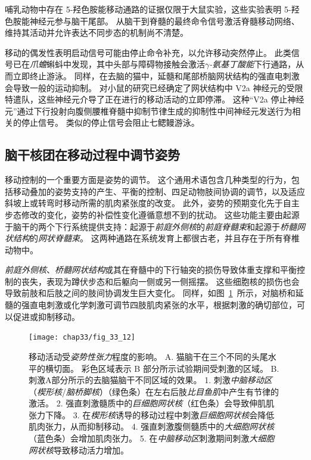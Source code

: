 哺乳动物中存在 5-羟色胺能移动通路的证据仅限于大鼠实验，这些实验表明 5-羟色胺能神经元参与脑干尾部。
从脑干到脊髓的最终命令信号激活脊髓移动网络、维持其活动并允许表达不同步态的机制尚不清楚。


移动的偶发性表明启动信号可能由停止命令补充，以允许移动突然停止。
此类信号已在\textit{爪蟾}蝌蚪中发现，其中头部与障碍物接触会激活\textit{$\gamma$-氨基丁酸能}下行通路，从而立即终止游泳。
同样，在去脑的猫中，延髓和尾部桥脑网状结构的强直电刺激会导致一般的运动抑制。
对小鼠的研究已经确定了网状结构中 V2a 神经元的受限特遣队，这些神经元介导了正在进行的移动活动的立即停滞。
这种“V2a 停止神经元”通过下行投射向腹侧腰椎脊髓中抑制节律生成的抑制性中间神经元发送行为相关的停止信号。
类似的停止信号会阻止七鳃鳗游泳。



\subsection{脑干核团在移动过程中调节姿势}

移动控制的一个重要方面是姿势的调节。
这个通用术语包含几种类型的行为，包括移动叠加的姿势支持的产生、平衡的控制、四足动物肢间协调的调节，以及适应斜坡上或转弯时移动所需的肌肉紧张度的改变。
此外，姿势的预期变化先于自主步态修改的变化，姿势的补偿性变化遵循意想不到的扰动。
这些功能主要由起源于脑干的两个下行系统提供支持：起源于\textit{前庭外侧核}的\textit{前庭脊髓束}和起源于\textit{桥髓网状结构}的\textit{网状脊髓束}。
这两种通路在系统发育上都很古老，并且存在于所有脊椎动物中。


\textit{前庭外侧核}、\textit{桥髓网状结构}或其在脊髓中的下行轴突的损伤导致体重支撑和平衡控制的丧失，表现为蹲伏步态和后躯向一侧或另一侧摇摆。
这些细胞核的损伤也会导致前肢和后肢之间的肢间协调发生巨大变化。
同样，如图~\ref{fig:33_12}~所示，对脑桥和延髓的强直电刺激或化学刺激可调节四肢肌肉紧张的水平，根据刺激的确切部位，可以促进或抑制移动。


\begin{figure}[htbp]
	\centering
	\texttt{[image: chap33/fig\_33\_12]}
	\caption{移动活动受\textit{姿势性张力}程度的影响。
		A. 猫脑干在三个不同的头尾水平的横切面。 彩色区域表示 B 部分所示试验期间受刺激的区域。
		B. 刺激A部分所示的去脑猫脑干不同区域的效果。
		1. 刺激\textit{中脑移动区}（\textit{楔形核}/\textit{脑桥脚核}）（绿色条）在左右后肢\textit{比目鱼肌}中产生有节律的激活。
		2. 强直刺激髓质中的\textit{巨细胞网状核}（红色条）会导致伸肌肌张力下降。
		3. 在\textit{楔形核}诱导的移动过程中刺激\textit{巨细胞网状核}会降低肌肉张力，从而抑制移动。
		4. 强直刺激腹侧髓质中的\textit{大细胞网状核}（蓝色条）会增加肌肉张力。
		5. 在\textit{中脑移动区}刺激期间刺激\textit{大细胞网状核}导致移动活力增加。}
	\label{fig:33_12}
\end{figure}


